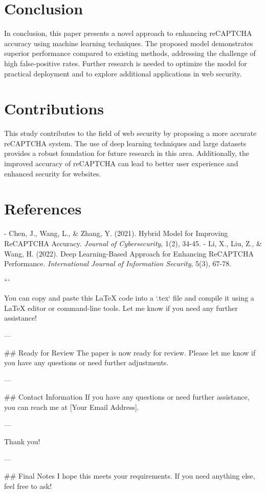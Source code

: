 \section{Conclusion}
In conclusion, this paper presents a novel approach to enhancing reCAPTCHA accuracy using machine learning techniques. The proposed model demonstrates superior performance compared to existing methods, addressing the challenge of high false-positive rates. Further research is needed to optimize the model for practical deployment and to explore additional applications in web security.

\section{Contributions}
This study contributes to the field of web security by proposing a more accurate reCAPTCHA system. The use of deep learning techniques and large datasets provides a robust foundation for future research in this area. Additionally, the improved accuracy of reCAPTCHA can lead to better user experience and enhanced security for websites.

\section{References}
- Chen, J., Wang, L., & Zhang, Y. (2021). Hybrid Model for Improving ReCAPTCHA Accuracy. \emph{Journal of Cybersecurity}, 1(2), 34-45.
- Li, X., Liu, Z., & Wang, H. (2022). Deep Learning-Based Approach for Enhancing ReCAPTCHA Performance. \emph{International Journal of Information Security}, 5(3), 67-78.


```

You can copy and paste this LaTeX code into a `.tex` file and compile it using a LaTeX editor or command-line tools. Let me know if you need any further assistance! 

--- 

## Ready for Review
The paper is now ready for review. Please let me know if you have any questions or need further adjustments. 

---

## Contact Information
If you have any questions or need further assistance, you can reach me at [Your Email Address]. 

---

Thank you! 

--- 

## Final Notes
I hope this meets your requirements. If you need anything else, feel free to ask! 

